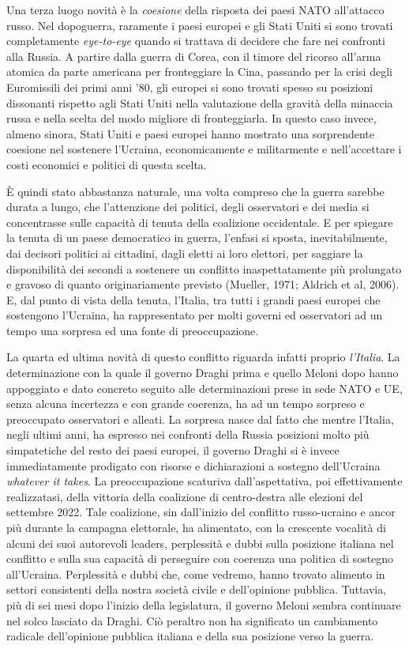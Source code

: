 \documentclass[
]{book}
\begin{document}
Una terza luogo novità è la \emph{coesione} della risposta dei paesi NATO all'attacco russo. Nel dopoguerra, raramente i paesi europei e gli Stati Uniti si sono trovati completamente \emph{eye-to-eye} quando si trattava di decidere che fare nei confronti alla Russia. A partire dalla guerra di Corea, con il timore del ricorso all'arma atomica da parte americana per fronteggiare la Cina, passando per la crisi degli Euromissili dei primi anni '80, gli europei si sono trovati spesso su posizioni dissonanti rispetto agli Stati Uniti nella valutazione della gravità della minaccia russa e nella scelta del modo migliore di fronteggiarla. In questo caso invece, almeno sinora, Stati Uniti e paesi europei hanno mostrato una sorprendente coesione nel sostenere l'Ucraina, economicamente e militarmente e nell'accettare i costi economici e politici di questa scelta.

È quindi stato abbastanza naturale, una volta compreso che la guerra sarebbe durata a lungo, che l'attenzione dei politici, degli osservatori e dei media si concentrasse sulle capacità di tenuta della coalizione occidentale. E per spiegare la tenuta di un paese democratico in guerra, l'enfasi si sposta, inevitabilmente, dai decisori politici ai cittadini, dagli eletti ai loro elettori, per saggiare la disponibilità dei secondi a sostenere un conflitto inaspettatamente più prolungato e gravoso di quanto originariamente previsto (Mueller, 1971; Aldrich et al, 2006). E, dal punto di vista della tenuta, l'Italia, tra tutti i grandi paesi europei che sostengono l'Ucraina, ha rappresentato per molti governi ed osservatori ad un tempo una sorpresa ed una fonte di preoccupazione.

La quarta ed ultima novità di questo conflitto riguarda infatti proprio \emph{l'Italia}. La determinazione con la quale il governo Draghi prima e quello Meloni dopo hanno appoggiato e dato concreto seguito alle determinazioni prese in sede NATO e UE, senza alcuna incertezza e con grande coerenza, ha ad un tempo sorpreso e preoccupato osservatori e alleati. La sorpresa nasce dal fatto che mentre l'Italia, negli ultimi anni, ha espresso nei confronti della Russia posizioni molto più simpatetiche del resto dei paesi europei, il governo Draghi si è invece immediatamente prodigato con risorse e dichiarazioni a sostegno dell'Ucraina \emph{whatever it takes}. La preoccupazione scaturiva dall'aspettativa, poi effettivamente realizzatasi, della vittoria della coalizione di centro-destra alle elezioni del settembre 2022. Tale coalizione, sin dall'inizio del conflitto russo-ucraino e ancor più durante la campagna elettorale, ha alimentato, con la crescente vocalità di alcuni dei suoi autorevoli leaders, perplessità e dubbi sulla posizione italiana nel conflitto e sulla sua capacità di perseguire con coerenza una politica di sostegno all'Ucraina. Perplessità e dubbi che, come vedremo, hanno trovato alimento in settori consistenti della nostra società civile e dell'opinione pubblica. Tuttavia, più di sei mesi dopo l'inizio della legislatura, il governo Meloni sembra continuare nel solco lasciato da Draghi. Ciò peraltro non ha significato un cambiamento radicale dell'opinione pubblica italiana e della sua posizione verso la guerra.
\end{document}
